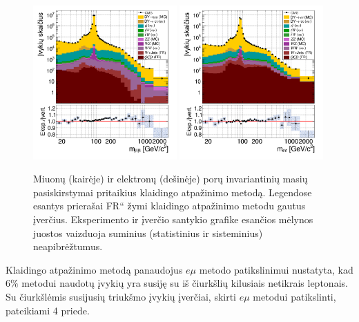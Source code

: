 \documentclass[a4paper, 12pt, oneside]{article}
\newcommand{\emu}{e\mu}
\newcommand{\ltq}[1]{{\quotedblbase{}#1\textquotedblleft{}}}
\newlength\q
\begin{document}
\begin{figure}[b!]
	\includegraphics[width=0.49\textwidth]{Magistrinis/MuMumass_afterFR.png}
	\includegraphics[width=0.49\textwidth]{Magistrinis/EEmass_afterFR.png}
	\vspace{-0.3cm}
	\caption{\label{fig:MassFinal}
		Miuonų (kairėje) ir elektronų (dešinėje) porų invariantinių masių pasiskirstymai pritaikius klaidingo atpažinimo metodą.
		Legendose esantys prierašai \ltq{FR} žymi klaidingo atpažinimo metodu gautus įverčius.
		Eksperimento ir įverčio santykio grafike esančios mėlynos juostos vaizduoja suminius (statistinius ir sisteminius)
		neapibrėžtumus.}
\end{figure}

Klaidingo atpažinimo metodą panaudojus $\emu$ metodo patikslinimui nustatyta, kad $6\%$ metodui naudotų įvykių yra susiję su
iš čiurkšlių kilusiais netikrais leptonais.
Su čiurkšlėmis susijusių triukšmo įvykių įverčiai, skirti $\emu$ metodui patikslinti, pateikiami 4 priede.
\end{document}
